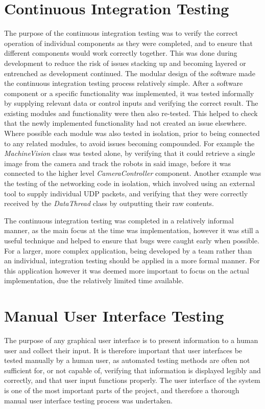 \section{Continuous Integration Testing} \label{ContinuousIntegrationTesting}
The purpose of the continuous integration testing was to verify the correct operation of individual components as they were completed, and to ensure that different components would work correctly together. This was done during development to reduce the risk of issues stacking up and becoming layered or entrenched as development continued. The modular design of the software made the continuous integration testing process relatively simple. After a software component or a specific functionality was implemented, it was tested informally by supplying relevant data or control inputs and verifying the correct result. The existing modules and functionality were then also re-tested. This helped to check that the newly implemented functionality had not created an issue elsewhere. Where possible each module was also tested in isolation, prior to being connected to any related modules, to avoid issues becoming compounded. For example the \textit{MachineVision} class was tested alone, by verifying that it could retrieve a single image from the camera and track the robots in said image, before it was connected to the higher level \textit{CameraController} component. Another example was the testing of the networking code in isolation, which involved using an external tool to supply individual UDP packets, and verifying that they were correctly received by the \textit{DataThread} class by outputting their raw contents. 

The continuous integration testing was completed in a relatively informal manner, as the main focus at the time was implementation, however it was still a useful technique and helped to ensure that bugs were caught early when possible. For a larger, more complex application, being developed by a team rather than an individual, integration testing should be applied in a more formal manner. For this application however it was deemed more important to focus on the actual implementation, due the relatively limited time available.


\section{Manual User Interface Testing} \label{ManualUserInterfaceTesting}
The purpose of any graphical user interface is to present information to a human user and collect their input. It is therefore important that user interfaces be tested manually by a human user, as automated testing methods are often not sufficient for, or not capable of, verifying that information is displayed legibly and correctly, and that user input functions properly. The user interface of the system is one of the most important parts of the project, and therefore a thorough manual user interface testing process was undertaken.

